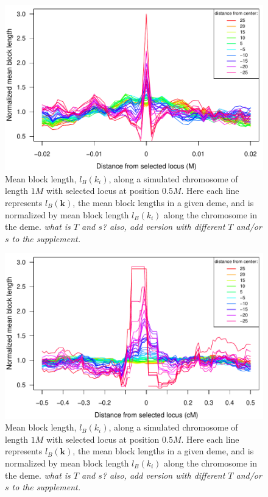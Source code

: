 \documentclass[11pt,letterpaper]{article}
\newcommand{\plr}[1]{{\em \color{blue} #1}}
\begin{document}
\begin{figure}
\includegraphics{figs/blocksAlongChromAncBConditioning}
\caption{Mean block length, $l_B(k_i)$, along a simulated chromosome of length $1M$ with selected locus at position $0.5M$. Here each line represents  $l_B(\mathbf{k})$, the mean block lengths in a given deme, and is normalized by mean block length $l_B(k_i)$ along the chromosome in the deme.
    \plr{what is $T$ and $s$? also, add version with different $T$ and/or $s$ to the supplement.}
}\label{Fig:blockLengths}
\end{figure}



\begin{figure}
\includegraphics{figs/blocksAlongChromAncBConditioningHighRes}
\caption{Mean block length, $l_B(k_i)$, along a simulated chromosome of length $1M$ with selected locus at position $0.5M$. Here each line represents  $l_B(\mathbf{k})$, the mean block lengths in a given deme, and is normalized by mean block length $l_B(k_i)$ along the chromosome in the deme.
    \plr{what is $T$ and $s$? also, add version with different $T$ and/or $s$ to the supplement.}
}\label{Fig:blockLengths}
\end{figure}
\end{document}
